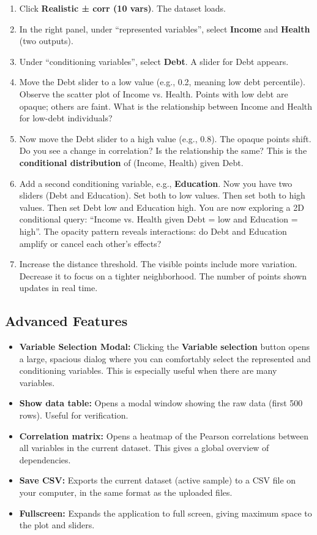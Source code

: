\documentclass[12pt]{article}
\begin{document}
\begin{enumerate}
    \item Click \textbf{Realistic ± corr (10 vars)}. The dataset loads.
    \item In the right panel, under “represented variables”, select \textbf{Income} and \textbf{Health} (two outputs).
    \item Under “conditioning variables”, select \textbf{Debt}. A slider for Debt appears.
    \item Move the Debt slider to a low value (e.g., 0.2, meaning low debt percentile). Observe the scatter plot of Income vs. Health. Points with low debt are opaque; others are faint. What is the relationship between Income and Health for low-debt individuals?
    \item Now move the Debt slider to a high value (e.g., 0.8). The opaque points shift. Do you see a change in correlation? Is the relationship the same? This is the \textbf{conditional distribution} of (Income, Health) given Debt.
    \item Add a second conditioning variable, e.g., \textbf{Education}. Now you have two sliders (Debt and Education). Set both to low values. Then set both to high values. Then set Debt low and Education high. You are now exploring a 2D conditional query: “Income vs. Health given Debt = low and Education = high”. The opacity pattern reveals interactions: do Debt and Education amplify or cancel each other's effects?
    \item Increase the distance threshold. The visible points include more variation. Decrease it to focus on a tighter neighborhood. The number of points shown updates in real time.
\end{enumerate}

\subsection{Advanced Features}

\begin{itemize}
    \item \textbf{Variable Selection Modal:} Clicking the \textbf{Variable selection} button opens a large, spacious dialog where you can comfortably select the represented and conditioning variables. This is especially useful when there are many variables.
    \item \textbf{Show data table:} Opens a modal window showing the raw data (first 500 rows). Useful for verification.
    \item \textbf{Correlation matrix:} Opens a heatmap of the Pearson correlations between all variables in the current dataset. This gives a global overview of dependencies.
    \item \textbf{Save CSV:} Exports the current dataset (active sample) to a CSV file on your computer, in the same format as the uploaded files.
    \item \textbf{Fullscreen:} Expands the application to full screen, giving maximum space to the plot and sliders.
\end{itemize}
\end{document}
